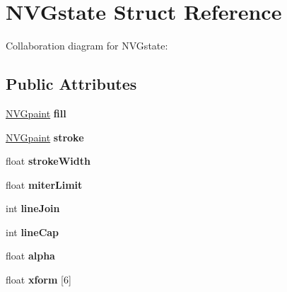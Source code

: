 \hypertarget{struct_n_v_gstate}{\section{N\+V\+Gstate Struct Reference}
\label{struct_n_v_gstate}
}


Collaboration diagram for N\+V\+Gstate\+:
\subsection*{Public Attributes}
\begin{DoxyCompactItemize}
\item 
\hypertarget{struct_n_v_gstate_a4e3b48558a7c9a62720737ea39b498a4}{\hyperlink{struct_n_v_gpaint}{N\+V\+Gpaint} {\bfseries fill}}\label{struct_n_v_gstate_a4e3b48558a7c9a62720737ea39b498a4}

\item 
\hypertarget{struct_n_v_gstate_a0295164769d250af4712172ea1624d06}{\hyperlink{struct_n_v_gpaint}{N\+V\+Gpaint} {\bfseries stroke}}\label{struct_n_v_gstate_a0295164769d250af4712172ea1624d06}

\item 
\hypertarget{struct_n_v_gstate_a0266a3e8c86c689a7eba07cf1b8adac2}{float {\bfseries stroke\+Width}}\label{struct_n_v_gstate_a0266a3e8c86c689a7eba07cf1b8adac2}

\item 
\hypertarget{struct_n_v_gstate_a274ff13d3a13ed64b17f45eed44ff02a}{float {\bfseries miter\+Limit}}\label{struct_n_v_gstate_a274ff13d3a13ed64b17f45eed44ff02a}

\item 
\hypertarget{struct_n_v_gstate_a5aa107c0177e88030124c63b306b6d01}{int {\bfseries line\+Join}}\label{struct_n_v_gstate_a5aa107c0177e88030124c63b306b6d01}

\item 
\hypertarget{struct_n_v_gstate_ad1767dce784dc325d7e16364ce92c8ec}{int {\bfseries line\+Cap}}\label{struct_n_v_gstate_ad1767dce784dc325d7e16364ce92c8ec}

\item 
\hypertarget{struct_n_v_gstate_adb1c9942812308a4ecfbdf765d0bf1f2}{float {\bfseries alpha}}\label{struct_n_v_gstate_adb1c9942812308a4ecfbdf765d0bf1f2}

\item 
\hypertarget{struct_n_v_gstate_ad59f377ee80c48e3e37e4deb3464e030}{float {\bfseries xform} \mbox{[}6\mbox{]}}\label{struct_n_v_gstate_ad59f377ee80c48e3e37e4deb3464e030}


\end{DoxyCompactItemize}
